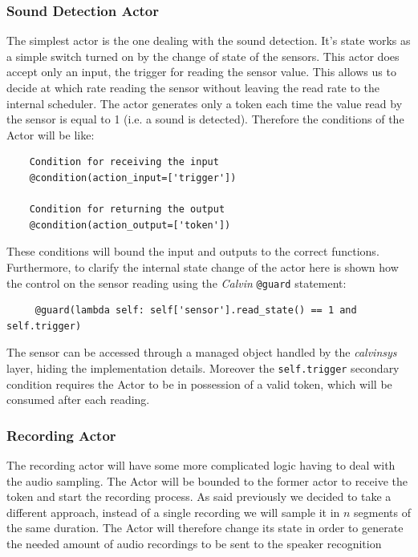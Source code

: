\subsubsection{Sound Detection Actor}

The simplest actor is the one dealing with the sound detection. It's state works
as a simple switch turned on by the change of state of the sensors. This actor does
accept only an input, the trigger for reading the sensor value. This allows us to
decide at which rate reading the sensor without leaving the read rate to the internal
scheduler. The actor generates only a token each time the value read by the
sensor is equal to 1 (i.e. a sound is detected). Therefore the conditions
of the Actor will be like:

\begin{verbatim}
    Condition for receiving the input
    @condition(action_input=['trigger'])

    Condition for returning the output
    @condition(action_output=['token'])

\end{verbatim}
 These conditions will bound the input and outputs to the correct functions.
 Furthermore, to clarify the internal state change of the actor here is shown
 how the control on the sensor reading using the \textit{Calvin} \texttt{@guard}
 statement:

 \begin{verbatim}
     @guard(lambda self: self['sensor'].read_state() == 1 and self.trigger)
 \end{verbatim}
 The sensor can be accessed through a managed object handled by the \textit{calvinsys}
 layer, hiding the implementation details. Moreover the \texttt{self.trigger} secondary
 condition requires the Actor to be in possession of a valid token, which will be consumed
 after each reading.

 \subsubsection{Recording Actor}

 The recording actor will have some more complicated logic having to deal with
 the audio sampling. The Actor will be bounded to the former actor to receive
 the token and start the recording process. As said previously we decided to
 take a different approach, instead of a single recording we will sample it in
 $n$ segments of the same duration. The Actor will therefore change its state
 in order to generate the needed amount of audio recordings to be sent to the
 speaker recognition

